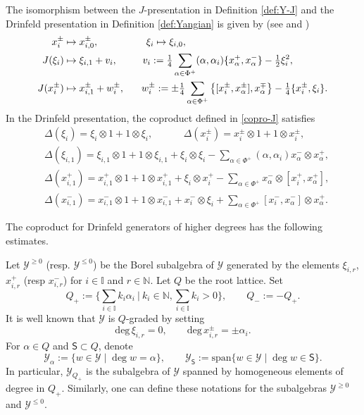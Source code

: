\documentclass[11pt,reqno]{amsart}
\numberwithin{equation}{section}
\theoremstyle{definition}
\theoremstyle{remark}
\newcommand{\bN}{\mathbb{N}}
\newcommand{\gge}{\geqslant}
\newcommand{\lle}{\leqslant}
\newcommand{\I}{{\mathbb I}}
\newcommand{\Y}{{\mathscr{Y}}}
\begin{document}
The isomorphism between the \(J\)-presentation in Definition \ref{def:Y-J} and the Drinfeld presentation in Definition \ref{def:Yangian} is given by (see \cite[Theorem~1]{Dri87} and \cite[Theorem~2.6]{GRW19})
\begin{equation}\label{eq:J}
  \begin{split}
  x^\pm_i & \mapsto x^\pm_{i,0}, \hskip1.7cm \xi_i \mapsto \xi_{i,0},
\\
  J(\xi_i) & \mapsto \xi_{i,1} + v_i, \hskip0.9cm
  v_i := \tfrac14 \sum_{\alpha\in\Phi^+}
  (\alpha,\alpha_i) \{x^+_\alpha, x^-_\alpha\}
  - \tfrac12 \xi_i^2,
\\
  J(x^\pm_i) &\mapsto x^\pm_{i, 1} + w^\pm_i, \hskip0.6cm
  w^\pm_i := \pm \tfrac14
  \sum_{\alpha\in\Phi^+} \left\{[x_i^\pm,x^\pm_\alpha],x^\mp_\alpha\right\} 
  - \tfrac14\{x^\pm_i,\xi_i\}.
  \end{split}
\end{equation}
In the Drinfeld presentation, the coproduct defined in \eqref{copro-J} satisfies
\begin{align*}
&\Delta(\xi_i)=\xi_i\otimes 1+1\otimes \xi_i,\qquad ~~~~~\Delta(x_i^\pm)=x_i^\pm\otimes 1+1\otimes x_i^\pm,\\
&\Delta(\xi_{i,1})=\xi_{i,1}\otimes 1+1\otimes \xi_{i,1}+\xi_{i}\otimes \xi_{i}-\sum_{\alpha\in\Phi^+}(\alpha,\alpha_i)x_{\alpha}^-\otimes x_\alpha^+,\\
&\Delta(x_{i,1}^+)=x_{i,1}^+\otimes 1+1\otimes x_{i,1}^++\xi_{i}\otimes x_{i}^+-\sum_{\alpha\in\Phi^+}x_{\alpha}^-\otimes [x_{i}^+,x_\alpha^+],\\
&\Delta(x_{i,1}^-)=x_{i,1}^-\otimes 1+1\otimes x_{i,1}^-+x_{i}^-\otimes \xi_{i}+\sum_{\alpha\in\Phi^+}[x_{i}^-,x_\alpha^-]\otimes x_\alpha^+.
\end{align*}

The coproduct for Drinfeld generators of higher degrees has the following estimates. 

Let $\Y^{\gge 0}$ (resp. $\Y^{\lle 0}$) be the Borel subalgebra of $\Y$ generated by the elements $\xi_{i,r}$, $x_{i,r}^+$ (resp $x_{i,r}^-$) for $i\in\I$ and $r\in\bN$. Let $Q$ be the root lattice. Set
\[
Q_+:=\Big\{\sum_{i\in\I}k_i\alpha_i~\Big|~k_i\in\bN,\sum_{i\in \I}k_i>0\Big\},\qquad Q_-:=-Q_+.
\]
It is well known that $\Y$ is $Q$-graded by setting
\[
\mathrm{deg}\,\xi_{i,r}=0,\qquad \mathrm{deg}\,x_{i,r}^\pm=\pm\alpha_i. 
\]
For $\alpha\in Q$ and $\mathsf S\subset Q$, denote
\[
\Y_{\alpha} :=\{w\in \Y\mid \deg w=\alpha\},\qquad \Y_{\mathsf S} :=\mathrm{span}\{w\in \Y\mid \deg w\in \mathsf S\}.
\]
In particular, $\Y_{Q_+}$ is the subalgebra of $\Y$ spanned by homogeneous elements of degree in $Q_+$. Similarly, one can define these notations for the subalgebras $\Y^{\gge 0}$ and $\Y^{\lle 0}$.
\end{document}
